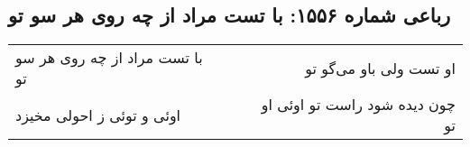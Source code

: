 \begin{center}
\section*{رباعی شماره ۱۵۵۶: با تست مراد از چه روی هر سو تو}
\label{sec:1556}
\begin{longtable}{l p{0.5cm} r}
با تست مراد از چه روی هر سو تو
&&
او تست ولی باو می‌گو تو
\\
اوئی و توئی ز احولی مخیزد
&&
چون دیده شود راست تو اوئی او تو
\\
\end{longtable}
\end{center}
